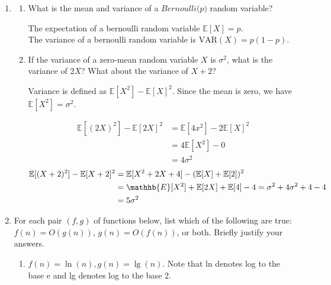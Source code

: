 \documentclass[letterpaper]{article}
\theoremstyle{definition}
\begin{document}
\begin{enumerate}
\color{teal}
(a) -> (v) \\[0pt]
(b) -> (iv) \\[0pt]
(c) -> (ii) \\[0pt]
(d) -> (i) \\[0pt]
(e) -> (iii) \\[0pt]
\color{black}

\item \begin{enumerate}
\item What is the mean and variance of a \(\textit{Bernoulli(p)}\) random variable?

\color{teal}
The expectation of a bernoulli random variable \(\mathbb{E}[X] = p\). \\[0pt]
The variance of a bernoulli random variable is \(\text{VAR}(X) = p(1 - p)\).
\color{black}

\item If the variance of a zero-mean random variable \(X\) is \(\sigma^2\),
what is the variance of \(2X\)? What about the variance of \(X + 2\)?

\color{teal}
Variance is defined as \(\mathbb{E}[X^2] - \mathbb{E}[X]^2\).
Since the mean is zero, we have \(\mathbb{E}[X^2] = \sigma^2\).

\begin{align*}
\mathbb{E}[(2X)^2] - \mathbb{E}[2X]^2 &= \mathbb{E}[4x^2] - 2\mathbb{E}[X]^2 \\
&= 4\mathbb{E}[X^2] - 0 \\
&= 4\sigma^2
\end{align*}
\begin{align*}
\mathbb{E}[(X + 2)^2] - \mathbb{E}[X + 2]^2 
&= \mathbb{E}[X^2 + 2X + 4] - (\mathbb{E}[X] + \mathbb{E}[2])^2 \\
&= \mathhb{E}[X^2] + \mathbb{E}[2X] + \mathbb{E}[4] - 4 = \sigma^2 + 4\sigma^2 + 4 - 4 \\
&= 5\sigma^2
\end{align*}
\color{black}
\end{enumerate}

\item For each pair \((f, g)\) of functions below, list which of the following are true: \(f(n)=O(g(n))\), \(g(n)=O(f(n))\), or both. Briefly justify your answers.\\[0pt]
\begin{enumerate}
\item \(f(n)=\ln (n), g(n)=\lg (n)\).
Note that ln denotes log to the base e and lg denotes log to the base 2.


\end{enumerate}
\end{enumerate}
\end{document}
